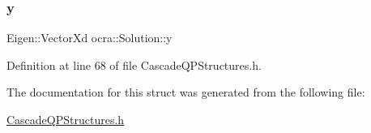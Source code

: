 \subsubsection{\texorpdfstring{y}{y}}
{\footnotesize\ttfamily Eigen\+::\+Vector\+Xd ocra\+::\+Solution\+::y}



Definition at line 68 of file Cascade\+Q\+P\+Structures.\+h.



The documentation for this struct was generated from the following file\+:\begin{DoxyCompactItemize}
\item 
\hyperlink{CascadeQPStructures_8h}{Cascade\+Q\+P\+Structures.\+h}\end{DoxyCompactItemize}
